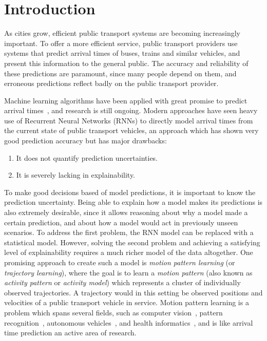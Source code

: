 \chapter{Introduction}
\label{cha:introduction}
As cities grow, efficient public transport systems
are becoming increasingly important. To offer a more efficient
service, public transport providers use systems
that predict arrival times of buses, trains and similar vehicles,
and present this information to the general public. The accuracy
and reliability of these predictions are paramount, since many
people depend on them, and erroneous predictions reflect badly on the
public transport provider.

Machine learning algorithms have been applied with great
promise to predict arrival times~\cite{kim2017probabilistic, 
  pang2018learning, Nguyen2018Jun}, and research is still ongoing.
Modern approaches have seen heavy use of Recurrent Neural Networks
(RNNs) to directly model arrival times from the current state of public
transport vehicles, an approach which has shown very good prediction accuracy
but has major drawbacks:

\begin{enumerate}
\item It does not quantify prediction uncertainties.
\item It is severely lacking in explainability.
\end{enumerate}

To make good decisions based of model predictions, it is important to 
know the prediction uncertainty. Being able to explain how
a model makes its predictions is also extremely desirable,
since it allows reasoning about why a model made a certain prediction,
and about how a model would act in previously unseen scenarios. 
To address the first problem, the RNN model can be replaced with
a statistical model. However, solving the second problem and achieving a satisfying
level of explainability requires a much richer model of the data altogether.
One promising approach to create such a model is \textit{motion
  pattern learning} (or \textit{trajectory learning}), where the goal is to learn a \textit{motion
  pattern} (also known as \textit{activity
  pattern} or \textit{activity model})
which represents a cluster of individually observed
trajectories. A trajectory would in this setting be observed positions
and velocities of a public transport vehicle in service. 
Motion pattern learning is a problem which spans several
fields, such as computer vision~\cite{Morris2008Sep, Zhang2006Aug,
  Kim2011Nov, Campo2017Aug}, pattern recognition~\cite{Tang2018Aug}, autonomous 
vehicles~\cite{Goli2018Jun}, and health
informatics~\cite{Pimentel2013Sep}, and is like arrival time
prediction an active area of research.

